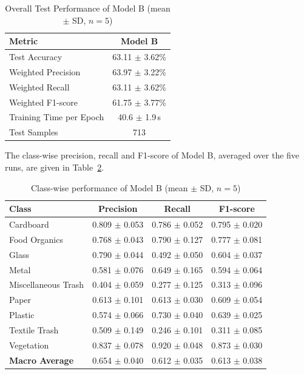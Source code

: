 \documentclass[12pt,a4paper]{article}
\begin{document}
\begin{table}[H]
\centering
\caption{Overall Test Performance of Model B (mean $\pm$ SD, $n=5$)}
\label{tab:model_b_overall}
\begin{tabular}{lc}
\hline
\textbf{Metric} & \textbf{Model B} \\
\hline
Test Accuracy & 63.11 $\pm$ 3.62\% \\
Weighted Precision & 63.97 $\pm$ 3.22\% \\
Weighted Recall & 63.11 $\pm$ 3.62\% \\
Weighted F1-score & 61.75 $\pm$ 3.77\% \\
Training Time per Epoch & 40.6 $\pm$ 1.9\,s \\
Test Samples & 713 \\
\hline
\end{tabular}
\end{table}

The class-wise precision, recall and F1-score of Model B, averaged over
the five runs, are given in Table~\ref{tab:model_b_classwise}.

\begin{table}[H]
\centering
\caption{Class-wise performance of Model B (mean $\pm$ SD, $n=5$)}
\label{tab:model_b_classwise}
\small
\begin{tabular}{lccc}
\hline
\textbf{Class} & \textbf{Precision} & \textbf{Recall} & \textbf{F1-score} \\
\hline
Cardboard & 0.809 $\pm$ 0.053 & 0.786 $\pm$ 0.052 & 0.795 $\pm$ 0.020 \\
Food Organics & 0.768 $\pm$ 0.043 & 0.790 $\pm$ 0.127 & 0.777 $\pm$ 0.081 \\
Glass & 0.790 $\pm$ 0.044 & 0.492 $\pm$ 0.050 & 0.604 $\pm$ 0.037 \\
Metal & 0.581 $\pm$ 0.076 & 0.649 $\pm$ 0.165 & 0.594 $\pm$ 0.064 \\
Miscellaneous Trash & 0.404 $\pm$ 0.059 & 0.277 $\pm$ 0.125 & 0.313 $\pm$ 0.096 \\
Paper & 0.613 $\pm$ 0.101 & 0.613 $\pm$ 0.030 & 0.609 $\pm$ 0.054 \\
Plastic & 0.574 $\pm$ 0.066 & 0.730 $\pm$ 0.040 & 0.639 $\pm$ 0.025 \\
Textile Trash & 0.509 $\pm$ 0.149 & 0.246 $\pm$ 0.101 & 0.311 $\pm$ 0.085 \\
Vegetation & 0.837 $\pm$ 0.078 & 0.920 $\pm$ 0.048 & 0.873 $\pm$ 0.030 \\
\hline
\textbf{Macro Average} & 0.654 $\pm$ 0.040 & 0.612 $\pm$ 0.035 & 0.613 $\pm$ 0.038 \\
\hline
\end{tabular}
\end{table}
\end{document}
